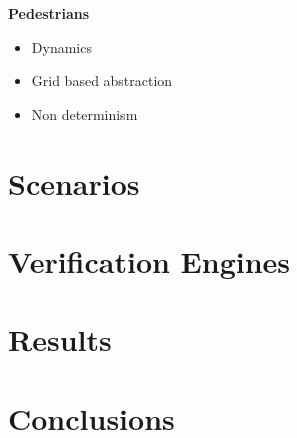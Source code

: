 \documentclass{easychair}
\begin{document}
\noindent \textbf{Pedestrians}
\begin{itemize}
	\item Dynamics
	\item Grid based abstraction
	\item Non determinism
\end{itemize}

\section{Scenarios}
\label{sect:scenarios}

\section{Verification Engines}

\section{Results}

\section{Conclusions}




\label{sect:bib}

%
%
%


\appendix
\end{document}
